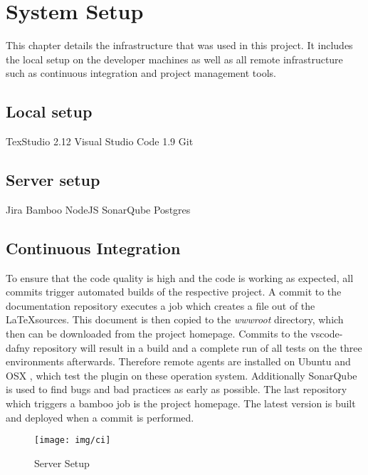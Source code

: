 \section{System Setup}
This chapter details the infrastructure that was used in this project. It includes the local setup on the developer machines as well as all remote infrastructure such as continuous integration and project management tools. 
\subsection{Local setup}
TexStudio 2.12\newline
Visual Studio Code 1.9\newline
Git 


\subsection{Server setup}
Jira \newline
Bamboo\newline
NodeJS\newline
SonarQube\newline
Postgres


\subsection{Continuous Integration}

To ensure that the code quality is high and the code is working as expected, all commits trigger automated builds of the respective project. A commit to the documentation repository executes a job which creates a file out of the \LaTeX sources. This document is then copied to the \emph{wwwroot} directory, which then can be downloaded from the project homepage. Commits to the vscode-dafny repository will result in a build and a complete run of all tests on the three environments afterwards. Therefore remote agents are installed on Ubuntu and OSX , which test the plugin on these operation system.  Additionally SonarQube is used to find bugs and bad practices as early as possible. The last repository which triggers a bamboo job is the project homepage. The latest version is built and deployed when a commit is performed. 


\begin{figure}[H]
	\centering
	\texttt{[image: img/ci]}
	\caption{Server Setup}
	\label{fig:Server setup}
\end{figure}